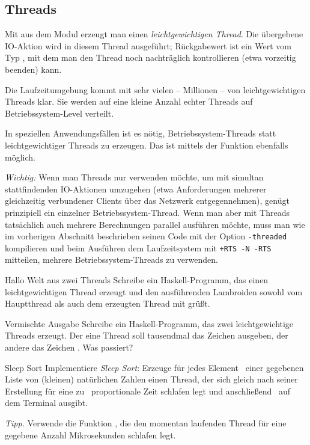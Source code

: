 \documentclass{uebblatt}
\begin{document}
\subsection{Threads}

Mit  aus dem Modul
 erzeugt man einen \emph{leichtgewichtigen
Thread}. Die übergebene IO-Aktion wird in diesem Thread ausgeführt;
Rückgabewert ist ein Wert vom Typ , mit dem man den
Thread noch nachträglich kontrollieren (etwa vorzeitig beenden) kann.

Die Laufzeitumgebung kommt mit sehr vielen -- Millionen -- von
leichtgewichtigen Threads klar. Sie werden auf eine kleine Anzahl
echter Threads auf Betriebssystem-Level verteilt.

In speziellen Anwendungsfällen ist es nötig, Betriebssystem-Threads statt
leichtgewichtiger Threads zu erzeugen. Das ist mittels der Funktion
 ebenfalls möglich.

\emph{Wichtig:} Wenn man Threads nur verwenden möchte, um mit simultan
stattfindenden IO-Aktionen umzugehen (etwa Anforderungen mehrerer gleichzeitig
verbundener Clients über das Netzwerk entgegennehmen), genügt prinzipiell ein
einzelner Betriebssystem-Thread. Wenn man aber mit Threads
tatsächlich auch mehrere Berechnungen parallel ausführen möchte, muss man
wie im vorherigen Abschnitt beschrieben seinen Code mit der Option
\texttt{-threaded} kompilieren und beim Ausführen
dem Laufzeitsystem mit \texttt{+RTS -N -RTS} mitteilen, mehrere
Betriebssystem-Threads zu verwenden.

\begin{aufgabe}{Hallo Welt aus zwei Threads}
Schreibe ein Haskell-Programm, das einen leichtgewichtigen Thread erzeugt
und den ausführenden Lambroiden sowohl vom Hauptthread als auch dem erzeugten
Thread mit  grüßt.
\end{aufgabe}

\begin{aufgabe}{Vermischte Ausgabe}
Schreibe ein Haskell-Programm, das zwei leichtgewichtige Threads erzeugt. Der
eine Thread soll tausendmal das Zeichen  ausgeben, der
andere das Zeichen . Was passiert?
\end{aufgabe}

\begin{aufgabe}{Sleep Sort}
Implementiere \emph{Sleep Sort}: Erzeuge für jedes
Element~ einer gegebenen Liste von (kleinen) natürlichen
Zahlen einen Thread, der sich gleich nach seiner Erstellung für eine
zu~ proportionale Zeit schlafen legt und
anschließend~ auf dem Terminal ausgibt.

{\scriptsize\emph{Tipp.} Verwende die Funktion , die den momentan laufenden Thread für eine gegebene Anzahl
Mikrosekunden schlafen legt.\par}
\end{aufgabe}
\end{document}
